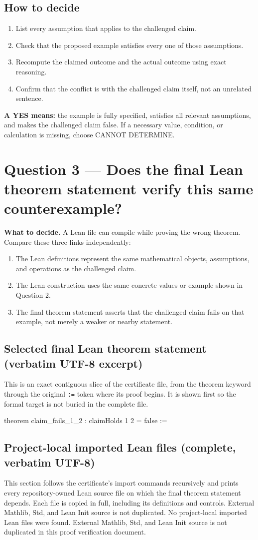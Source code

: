 \documentclass[11pt]{article}
\begin{document}
\subsection*{How to decide}
\begin{enumerate}
\item List every assumption that applies to the challenged claim.
\item Check that the proposed example satisfies every one of those assumptions.
\item Recompute the claimed outcome and the actual outcome using exact reasoning.
\item Confirm that the conflict is with the challenged claim itself, not an unrelated sentence.
\end{enumerate}
\textbf{A YES means:} the example is fully specified, satisfies all relevant assumptions, and makes the challenged claim false. If a necessary value, condition, or calculation is missing, choose CANNOT DETERMINE.
\section*{Question 3 --- Does the final Lean theorem statement verify this same counterexample?}
\textbf{What to decide.} A Lean file can compile while proving the wrong theorem. Compare these three links independently:
\begin{enumerate}
\item The Lean definitions represent the same mathematical objects, assumptions, and operations as the challenged claim.
\item The Lean construction uses the same concrete values or example shown in Question 2.
\item The final theorem statement asserts that the challenged claim fails on that example, not merely a weaker or nearby statement.
\end{enumerate}
\subsection*{Selected final Lean theorem statement (verbatim UTF-8 excerpt)}
This is an exact contiguous slice of the certificate file, from the theorem keyword through the original \texttt{:=} token where its proof begins. It is shown first so the formal target is not buried in the complete file.
\begin{Vlean}
theorem claim_fails_1_2 : claimHolds 1 2 = false :=
\end{Vlean}
\subsection*{Project-local imported Lean files (complete, verbatim UTF-8)}
This section follows the certificate's import commands recursively and prints every repository-owned Lean source file on which the final theorem statement depends. Each file is copied in full, including its definitions and controls. External Mathlib, Std, and Lean Init source is not duplicated.
No project-local imported Lean files were found. External Mathlib, Std, and Lean Init source is not duplicated in this proof verification document.
\end{document}

